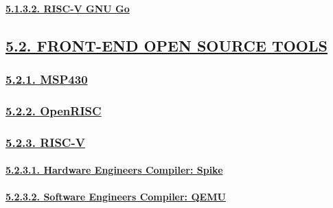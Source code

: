 \documentclass[
]{article}
\begin{document}
\hypertarget{risc-v-gnu-go}{%
\paragraph{\texorpdfstring{\protect\hyperlink{risc-v-gnu-go-1}{5.1.3.2.
RISC-V GNU Go}}{5.1.3.2. RISC-V GNU Go}}\label{risc-v-gnu-go}}

\hypertarget{front-end-open-source-tools-1}{%
\subsection{\texorpdfstring{\protect\hyperlink{front-end-open-source-tools-3}{5.2.
FRONT-END OPEN SOURCE
TOOLS}}{5.2. FRONT-END OPEN SOURCE TOOLS}}\label{front-end-open-source-tools-1}}

\hypertarget{msp430-2}{%
\subsubsection{\texorpdfstring{\protect\hyperlink{msp430-5}{5.2.1.
MSP430}}{5.2.1. MSP430}}\label{msp430-2}}

\hypertarget{openrisc-2}{%
\subsubsection{\texorpdfstring{\protect\hyperlink{openrisc-5}{5.2.2.
OpenRISC}}{5.2.2. OpenRISC}}\label{openrisc-2}}

\hypertarget{risc-v-2}{%
\subsubsection{\texorpdfstring{\protect\hyperlink{risc-v-5}{5.2.3.
RISC-V}}{5.2.3. RISC-V}}\label{risc-v-2}}

\hypertarget{hardware-engineers-compiler-spike}{%
\paragraph{\texorpdfstring{\protect\hyperlink{hardware-engineers-compiler-spike-1}{5.2.3.1.
Hardware Engineers Compiler:
Spike}}{5.2.3.1. Hardware Engineers Compiler: Spike}}\label{hardware-engineers-compiler-spike}}

\hypertarget{software-engineers-compiler-qemu}{%
\paragraph{\texorpdfstring{\protect\hyperlink{software-engineers-compiler-qemu-1}{5.2.3.2.
Software Engineers Compiler:
QEMU}}{5.2.3.2. Software Engineers Compiler: QEMU}}\label{software-engineers-compiler-qemu}}
\end{document}
